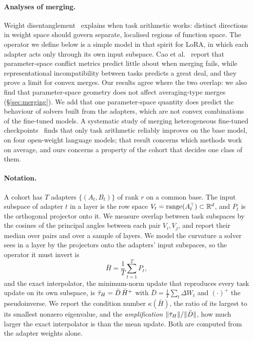 \paragraph{Analyses of merging.} Weight
disentanglement~\citep{ortizjimenez2023disentanglement} explains when task
arithmetic works: distinct directions in weight space should govern separate,
localised regions of function space. The operator we define below is a simple
model in that spirit for LoRA, in which each adapter acts only through its own
input subspace. Cao et al.~\citep{cao2026collapse} report that parameter-space conflict metrics
predict little about when merging fails, while representational
incompatibility between tasks predicts a great deal, and they prove a limit
for convex merges. Our results agree where the two overlap: we also find that
parameter-space geometry does not affect averaging-type merges
(\S\ref{sec:merging}). We add that one parameter-space quantity does predict
the behaviour of solvers built from the adapters, which are not convex
combinations of the fine-tuned models. A systematic study of merging
heterogeneous fine-tuned checkpoints~\citep{systematic2025merging} finds that
only task arithmetic reliably improves on the base model, on four open-weight
language models; that result concerns which methods work on average, and ours
concerns a property of the cohort that decides one class of them.

\paragraph{Notation.} A cohort has $T$ adapters $\{(A_t, B_t)\}$ of rank $r$ on
a common base. The input subspace of adapter $t$ in a layer is the row space
$V_t = \operatorname{range}(A_t^\top) \subset \mathbb{R}^d$, and $P_t$ is the orthogonal projector
onto it. We measure overlap between task subspaces by the cosines of the
principal angles between each pair $V_i, V_j$, and report their median over
pairs and over a sample of layers. We model the curvature a solver sees in a
layer by the projectors onto the adapters' input subspaces, so the operator it
must invert is
\begin{equation}\label{eq:hbar}
  \bar H = \frac1T \sum_{t=1}^T P_t,
\end{equation}
and the exact interpolator, the minimum-norm update that reproduces every task
update on its own subspace, is $\bar{\tau}_H = \bar D\,\bar H^{+}$ with
$\bar D = \tfrac1T\sum_t \Delta W_t$ and $(\cdot)^+$ the pseudoinverse. We
report the condition number $\kappa(\bar H)$, the ratio of its largest to its
smallest nonzero eigenvalue, and the \emph{amplification}
$\|\bar{\tau}_H\| / \|\bar D\|$, how much larger the exact interpolator is than the
mean update. Both are computed from the adapter weights alone.

